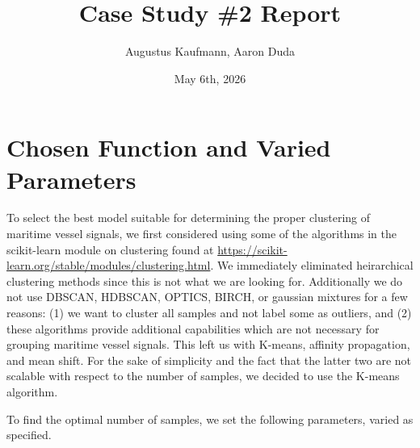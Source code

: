 \documentclass[12pt]{fphw}
\title{Case Study \#2 Report}
\author{Augustus Kaufmann, Aaron Duda}
\date{May 6th, 2026}
\institute{Case Western Reserve Univeristy}
\begin{document}
\maketitle

\section*{Chosen Function and Varied Parameters}

To select the best model suitable for determining the proper clustering of maritime vessel signals, we first considered using some of the algorithms in the scikit-learn module on
clustering found at \url{https://scikit-learn.org/stable/modules/clustering.html}. We immediately eliminated heirarchical clustering methods since this is not what we are looking for.
Additionally we do not use DBSCAN, HDBSCAN, OPTICS, BIRCH, or gaussian mixtures for a few reasons: (1) we want to cluster all samples and not label some as outliers, and (2)
these algorithms provide additional capabilities which are not necessary for grouping maritime vessel signals. This left us with K-means, affinity propagation, and mean shift. For the 
sake of simplicity and the fact that the latter two are not scalable with respect to the number of samples, we decided to use the K-means algorithm.

To find the optimal number of samples, we set the following parameters, varied as specified.
\end{document}
